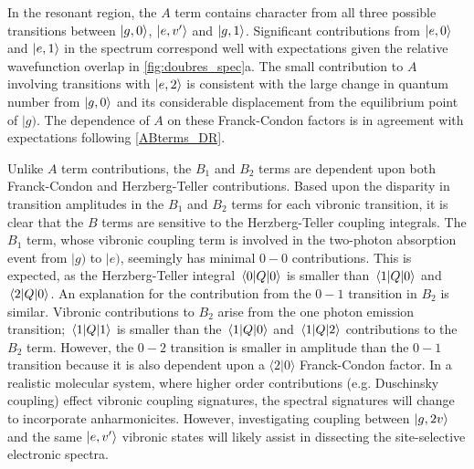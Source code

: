 \documentclass[aip, jcp, reprint, onecolumn]{revtex4-2}
\begin{document}
In the resonant region, the $A$ term contains character from all three possible transitions between $\ket{g,0}$, $\ket{e,v'}$ and $\ket{g,1}$. 
Significant contributions from $\ket{e,0}$ and $\ket{e,1}$ in the spectrum correspond well with expectations given the relative wavefunction overlap in \autoref{fig:doubres_spec}a. 
The small contribution to $A$ involving transitions with $\ket{e,2}$ is consistent with the large change in quantum number from $\ket{g,0}$ and its considerable displacement from the equilibrium point of $|g)$.
The dependence of $A$ on these Franck-Condon factors is in agreement with expectations following \autoref{ABterms_DR}. 

Unlike $A$ term contributions, the $B_1$ and $B_2$ terms are dependent upon both Franck-Condon and Herzberg-Teller contributions.
Based upon the disparity in transition amplitudes in the $B_1$ and $B_2$ terms for each vibronic transition, it is clear that the $B$ terms are sensitive to the Herzberg-Teller coupling integrals.
The $B_1$ term, whose vibronic coupling term is involved in the two-photon absorption event from $|g)$ to $|e)$, seemingly has minimal $0-0$ contributions. 
This is expected, as the Herzberg-Teller integral $\mel{0}{Q}{0}$ is smaller than $\mel{1}{Q}{0}$ and $\mel{2}{Q}{0}$. 
An explanation for the contribution from the $0-1$ transition in $B_2$ is similar.
Vibronic contributions to $B_2$ arise from the one photon emission transition; $\mel{1}{Q}{1}$ is smaller than the $\mel{1}{Q}{0}$ and $\mel{1}{Q}{2}$ contributions to the $B_2$ term.
However, the $0-2$ transition is smaller in amplitude than the $0-1$ transition because it is also dependent upon a $\langle 2 | 0 \rangle$ Franck-Condon factor.
In a realistic molecular system, where higher order contributions (e.g. Duschinsky coupling) effect vibronic coupling signatures, the spectral signatures will change to incorporate anharmonicites. \cite{Duschinsky1937, Carlson1990, Kundu2022}
However, investigating coupling between $\ket{g,2v}$ and the same $\ket{e,v'}$ vibronic states will likely assist in dissecting the site-selective electronic spectra.
\end{document}
